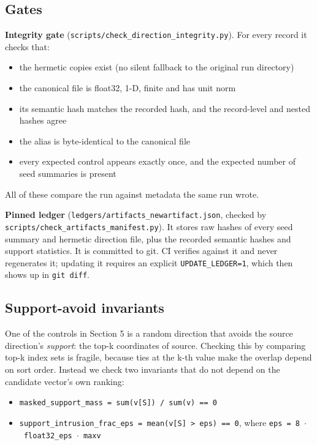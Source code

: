 \documentclass[
  10pt,
]{article}
\providecommand{\tightlist}{%
  \setlength{\itemsep}{0pt}\setlength{\parskip}{0pt}}
\begin{document}
\subsection{Gates}\label{gates}

\textbf{Integrity gate}
(\texttt{scripts/check\_direction\_integrity.py}). For every record it
checks that:

\begin{itemize}
\tightlist
\item
  the hermetic copies exist (no silent fallback to the original run
  directory)
\item
  the canonical file is float32, 1-D, finite and has unit norm
\item
  its semantic hash matches the recorded hash, and the record-level and
  nested hashes agree
\item
  the alias is byte-identical to the canonical file
\item
  every expected control appears exactly once, and the expected number
  of seed summaries is present
\end{itemize}

All of these compare the run against metadata the same run wrote.

\textbf{Pinned ledger} (\texttt{ledgers/artifacts\_newartifact.json},
checked by \texttt{scripts/check\_artifacts\_manifest.py}). It stores
raw hashes of every seed summary and hermetic direction file, plus the
recorded semantic hashes and support statistics. It is committed to git.
CI verifies against it and never regenerates it; updating it requires an
explicit \texttt{UPDATE\_LEDGER=1}, which then shows up in
\texttt{git\ diff}.

\subsection{Support-avoid invariants}\label{support-avoid-invariants}

One of the controls in Section 5 is a random direction that avoids the
source direction's \emph{support}: the top-k coordinates of
\textbar source\textbar. Checking this by comparing top-k index sets is
fragile, because ties at the k-th value make the overlap depend on sort
order. Instead we check two invariants that do not depend on the
candidate vector's own ranking:

\begin{itemize}
\tightlist
\item
  \texttt{masked\_support\_mass\ =\ sum(\textbar{}v{[}S{]}\textbar{})\ /\ sum(\textbar{}v\textbar{})\ ==\ 0}
\item
  \texttt{support\_intrusion\_frac\_eps\ =\ mean(\textbar{}v{[}S{]}\textbar{}\ \textgreater{}\ eps)\ ==\ 0},
  where \texttt{eps\ =\ 8\ $\cdot$\ float32\_eps\ $\cdot$\ max\textbar{}v\textbar{}}
\end{itemize}
\end{document}
